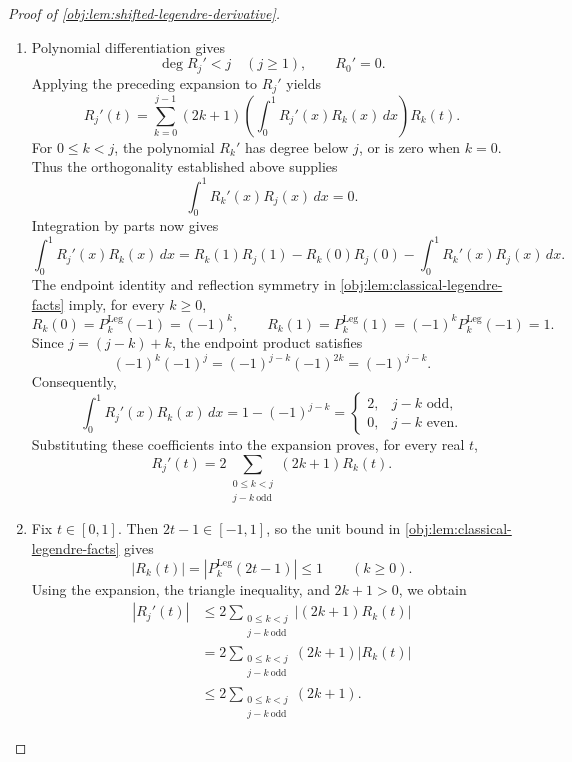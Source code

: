 \documentclass[11pt]{article}
\begin{document}
\begin{proof}[Proof of \cref{obj:lem:shifted-legendre-derivative}]
\begin{enumerate}
\item Polynomial differentiation gives
\[
\deg R_j'<j\quad(j\ge1),
\qquad R_0'=0.
\]
Applying the preceding expansion to \(R_j'\) yields
\[
R_j'(t)=
\sum_{k=0}^{j-1}(2k+1)
\left(\int_0^1R_j'(x)R_k(x)\,dx\right)R_k(t).
\]
For \(0\le k<j\), the polynomial \(R_k'\) has degree below \(j\), or is zero when \(k=0\). Thus the orthogonality established above supplies
\[
\int_0^1R_k'(x)R_j(x)\,dx=0.
\]
Integration by parts now gives
\[
\int_0^1R_j'(x)R_k(x)\,dx
=
R_k(1)R_j(1)-R_k(0)R_j(0)
-\int_0^1R_k'(x)R_j(x)\,dx.
\]
The endpoint identity and reflection symmetry in
\cref{obj:lem:classical-legendre-facts} imply, for every \(k\ge0\),
\[
R_k(0)=P_k^{\mathrm{Leg}}(-1)=(-1)^k,
\qquad
R_k(1)=P_k^{\mathrm{Leg}}(1)
=(-1)^kP_k^{\mathrm{Leg}}(-1)=1.
\]
Since \(j=(j-k)+k\), the endpoint product satisfies
\[
(-1)^k(-1)^j=(-1)^{j-k}(-1)^{2k}=(-1)^{j-k}.
\]
Consequently,
\[
\int_0^1R_j'(x)R_k(x)\,dx
=1-(-1)^{j-k}
=
\begin{cases}
2,&j-k\text{ odd},\\
0,&j-k\text{ even}.
\end{cases}
\]
Substituting these coefficients into the expansion proves, for every real \(t\),
\[
R_j'(t)=
2\sum_{\substack{0\le k<j\\j-k\ \mathrm{odd}}}(2k+1)R_k(t).
\]

\item Fix \(t\in[0,1]\). Then \(2t-1\in[-1,1]\), so the unit bound in \cref{obj:lem:classical-legendre-facts} gives
\[
|R_k(t)|=|P_k^{\mathrm{Leg}}(2t-1)|\le1
\qquad(k\ge0).
\]
Using the expansion, the triangle inequality, and \(2k+1>0\), we obtain
\[
\begin{aligned}
|R_j'(t)|
&\le
2\sum_{\substack{0\le k<j\\j-k\ \mathrm{odd}}}
|(2k+1)R_k(t)|\\
&=
2\sum_{\substack{0\le k<j\\j-k\ \mathrm{odd}}}
(2k+1)|R_k(t)|\\
&\le
2\sum_{\substack{0\le k<j\\j-k\ \mathrm{odd}}}(2k+1).
\end{aligned}
\]


\end{enumerate}
\end{proof}
\end{document}
